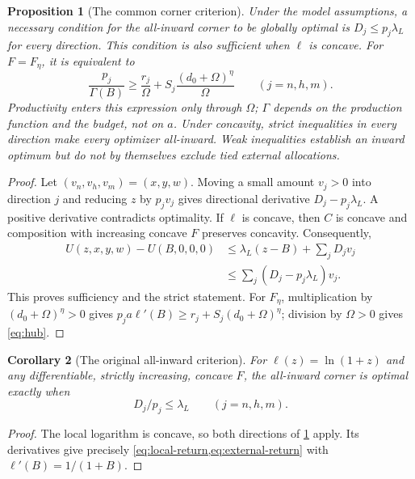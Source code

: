 \documentclass[11pt,a4paper]{article}
\newtheorem{proposition}{Proposition}
\newtheorem{corollary}[proposition]{Corollary}
\theoremstyle{definition}\newtheorem{definition}{Definition}
\begin{document}
\begin{proposition}[The common corner criterion]
\label{prop:hub}
Under the model assumptions, a necessary condition for the all-inward
corner to be globally optimal is
$D_j\leq p_j\lambda_L$ for every direction. This condition is also
sufficient when $\ell$ is concave. For $F=F_\eta$, it is equivalent to
\begin{equation}
 \boxed{\frac{p_j}{\Gamma(B)}\geq
 \frac{r_j}{\Omega}
 +S_j\frac{(d_0+\Omega)^\eta}{\Omega}}
 \qquad(j=n,h,m).
 \label{eq:hub}
\end{equation}
Productivity enters this expression only through $\Omega$; $\Gamma$
depends on the production function and the budget, not on $a$.
Under concavity, strict inequalities in every direction make every
optimizer all-inward. Weak inequalities establish an inward optimum
but do not by themselves exclude tied external allocations.
\end{proposition}
\begin{proof}
Let $(v_n,v_h,v_m)=(x,y,w)$. Moving a small amount $v_j>0$ into direction
$j$ and reducing $z$ by $p_jv_j$ gives directional derivative
$D_j-p_j\lambda_L$. A positive derivative contradicts optimality.
If $\ell$ is concave, then $C$ is concave and composition with increasing
concave $F$ preserves concavity. Consequently,
\begin{align}
 U(z,x,y,w)-U(B,0,0,0)
 &\leq\lambda_L(z-B)+\sum_jD_jv_j\nonumber\\
 &\leq\sum_j(D_j-p_j\lambda_L)v_j.
 \label{eq:cornerproof}
\end{align}
This proves sufficiency and the strict statement. For $F_\eta$,
multiplication by $(d_0+\Omega)^\eta>0$ gives
$p_ja\ell'(B)\geq r_j+S_j(d_0+\Omega)^\eta$; division by
$\Omega>0$ gives \cref{eq:hub}.
\end{proof}

\begin{corollary}[The original all-inward criterion]
\label{prop:corner}
For $\ell(z)=\ln(1+z)$ and any differentiable, strictly increasing,
concave $F$, the all-inward corner is optimal exactly when
\begin{equation}
 D_j/p_j\leq\lambda_L\qquad(j=n,h,m).
 \label{eq:corner}
\end{equation}
\end{corollary}
\begin{proof}
The local logarithm is concave, so both directions of
\cref{prop:hub} apply. Its derivatives give precisely
\cref{eq:local-return,eq:external-return} with
$\ell'(B)=1/(1+B)$.
\end{proof}
\end{document}
